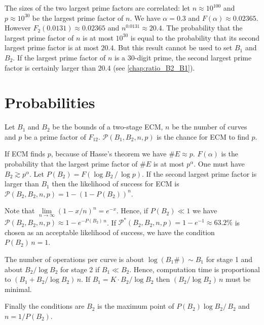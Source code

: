 \documentclass[a4paper, 11pt, pdftex]{report}
\theoremstyle{plain}
\theoremstyle{definition}
\begin{document}
\newpage

The sizes of the two largest prime factors are correlated: let $n \approx 10^{100}$
and $p \approx 10^{30}$ be the largest prime factor of $n$. We have $\alpha = 0.3$
and $F(\alpha) \approx 0.02365$. However $F_2(0.0131) \approx 0.02365$ and
$n^{0.0131} \approx 20.4$.
The probability that the largest prime factor of $n$ is at most $10^{30}$ is equal to
the probability that its second largest prime factor is at most $20.4$. But this result
cannot be used to set $B_1$ and $B_2$. If the largest prime factor of $n$ is a 30-digit
prime, the second largest prime factor is certainly larger than $20.4$
(see \autoref{chap:ratio_B2_B1}).

\section{Probabilities}

Let $B_1$ and $B_2$ be the bounds of a two-stage ECM, $n$ be the number of curves and $p$
be a prime factor of $F_{12}$. $\mathcal{P}(B_1, B_2, n, p)$ is the chance for ECM to
find $p$.

If ECM finds $p$, because of Hasse's theorem we have $\#E \approx p$. $F(\alpha)$ is the probability that
the largest prime factor of $\#E$ is at most $p^\alpha$. One must have $B_2 \gtrsim p^\alpha$.
Let $P(B_2) = F(\log B_2\, /\, \log p)$. If the second largest prime factor is larger than $B_1$
then the likelihood of success for ECM is
$\mathcal{P}(B_2, B_2, n, p) = 1 - \left(1 - P(B_2) \right)^n$.

Note that $\lim\limits_{n \to \infty} \left(1 - x/n \right)^n = e^{-x}$. Hence, if
$P(B_2) \ll 1$ we have $\mathcal{P}(B_2, B_2, n, p) \approx 1 - e^{-P(B_2)\, n}$.
If $\mathcal{P}^*(B_2, B_2, n, p) = 1 - e^{-1} \approx 63.2\%$ is chosen as an acceptable
likelihood of success, we have the condition $P(B_2)\, n = 1.$

The number of operations per curve is about $\log(B_1\#) \sim B_1$ for stage 1 and about
$B_2 / \log B_2$ for stage 2 if $B_1 \ll B_2$. Hence, computation time is proportional to
$\left(B_1 + B_2 / \log B_2 \right)\, n$. If $B_1 = K \cdot B_2 / \log B_2$ then
$\left(B_2 / \log B_2 \right)\, n$ must be minimal.

Finally the conditions are $B_2$ is the maximum point of $P(B_2) \log B_2 /\, B_2$
and $n = 1 / P(B_2)$.
\end{document}
